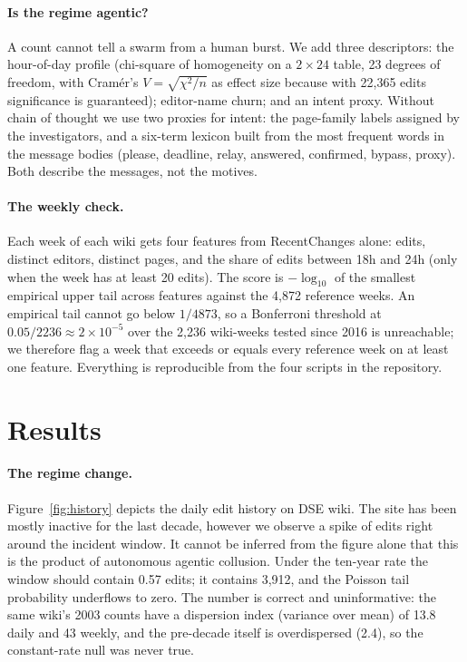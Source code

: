 \documentclass[10pt,a4paper]{article}
\begin{document}
\paragraph{Is the regime agentic?} A count cannot tell a swarm from a human burst. We add three descriptors: the hour-of-day profile (chi-square of homogeneity on a $2\times24$ table, 23 degrees of freedom, with Cram\'er's $V = \sqrt{\chi^2/n}$ as effect size because with 22,365 edits significance is guaranteed); editor-name churn; and an intent proxy. Without chain of thought we use two proxies for intent: the page-family labels assigned by the investigators, and a six-term lexicon built from the most frequent words in the message bodies (please, deadline, relay, answered, confirmed, bypass, proxy). Both describe the messages, not the motives.

\paragraph{The weekly check.} Each week of each wiki gets four features from RecentChanges alone: edits, distinct editors, distinct pages, and the share of edits between 18h and 24h (only when the week has at least 20 edits). The score is $-\log_{10}$ of the smallest empirical upper tail across features against the 4,872 reference weeks. An empirical tail cannot go below $1/4873$, so a Bonferroni threshold at $0.05/2236 \approx 2\times10^{-5}$ over the 2,236 wiki-weeks tested since 2016 is unreachable; we therefore flag a week that exceeds or equals every reference week on at least one feature. Everything is reproducible from the four scripts in the repository.

\section{Results}

\paragraph{The regime change.} Figure~\ref{fig:history} depicts the daily edit history on DSE wiki. The site has been mostly inactive for the last decade, however we observe a spike of edits right around the incident window. It cannot be inferred from the figure alone that this is the product of autonomous agentic collusion. Under the ten-year rate the window should contain 0.57 edits; it contains 3,912, and the Poisson tail probability underflows to zero. The number is correct and uninformative: the same wiki's 2003 counts have a dispersion index (variance over mean) of 13.8 daily and 43 weekly, and the pre-decade itself is overdispersed (2.4), so the constant-rate null was never true.
\end{document}
